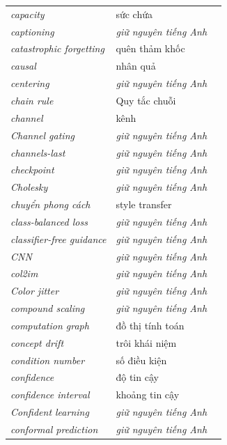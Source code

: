 \documentclass[deep_learning.tex]{subfiles}
\begin{document}
\begin{longtable}{@{}L{5.2cm}L{5.9cm}L{2.6cm}@{}}
\emph{capacity} & sức chứa & \\
\emph{captioning} & \emph{\color{tiercol}giữ nguyên tiếng Anh} & \\
\emph{catastrophic forgetting} & quên thảm khốc & \\
\emph{causal} & nhân quả & \\
\emph{centering} & \emph{\color{tiercol}giữ nguyên tiếng Anh} & \\
\emph{chain rule} & Quy tắc chuỗi & \\
\emph{channel} & kênh & \\
\emph{Channel gating} & \emph{\color{tiercol}giữ nguyên tiếng Anh} & \\
\emph{channels-last} & \emph{\color{tiercol}giữ nguyên tiếng Anh} & \\
\emph{checkpoint} & \emph{\color{tiercol}giữ nguyên tiếng Anh} & \\
\emph{Cholesky} & \emph{\color{tiercol}giữ nguyên tiếng Anh} & \\
\emph{chuyển phong cách} & style transfer & \\
\emph{class-balanced loss} & \emph{\color{tiercol}giữ nguyên tiếng Anh} & \\
\emph{classifier-free guidance} & \emph{\color{tiercol}giữ nguyên tiếng Anh} & \\
\emph{CNN} & \emph{\color{tiercol}giữ nguyên tiếng Anh} & \\
\emph{col2im} & \emph{\color{tiercol}giữ nguyên tiếng Anh} & \\
\emph{Color jitter} & \emph{\color{tiercol}giữ nguyên tiếng Anh} & \\
\emph{compound scaling} & \emph{\color{tiercol}giữ nguyên tiếng Anh} & \\
\emph{computation graph} & đồ thị tính toán & \\
\emph{concept drift} & trôi khái niệm & \\
\emph{condition number} & số điều kiện & \\
\emph{confidence} & độ tin cậy & \\
\emph{confidence interval} & khoảng tin cậy & \\
\emph{Confident learning} & \emph{\color{tiercol}giữ nguyên tiếng Anh} & \\
\emph{conformal prediction} & \emph{\color{tiercol}giữ nguyên tiếng Anh} & \\

\end{longtable}
\end{document}
